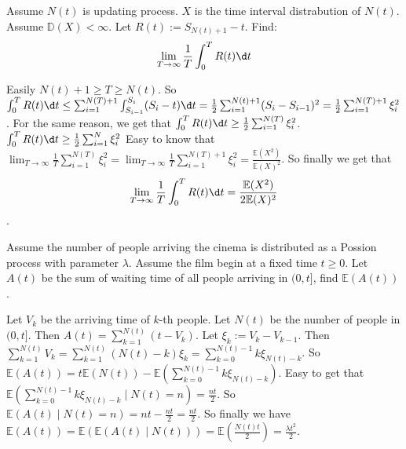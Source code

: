 \documentclass{ctexart}
\newif\ifpreface
\begin{document}
\large
\iffalse
\setlength{\baselineskip}{1.2em}
\ifpreface

\else
\maketitle
\fi
\fi
{}
\begin{problem}\label{pro:1}
  Assume \(N(t)\) is updating process. \(X\) is the time interval distrabution of \(N(t)\).
  Assume \(\mathbb{D}(X)<\infty\).
  Let \(R(t):=S_{N(t)+1}-t\). Find:
  \[
    \lim_{T \to \infty} \frac{1}{T}\int_{0}^{T}R(t) \d t
  \]
\end{problem}
\begin{solution}
  Easily \(N(t)+1 \geq T \geq N(t)\).
  So \(\int_{0}^{T}R(t) \d t \leq \sum_{i=1}^{N(T)+1} \int_{S_{i-1}}^{S_i}(S_i-t) \d t=\frac{1}{2}\sum_{i=1}^{N(t)+1} (S_i-S_{i-1})^2=\frac{1}{2} \sum_{i=1}^{N(T)+1} \xi_i^2\).
  For the same reason, we get that \(\int_{0}^{T}R(t) \d t \geq \frac{1}{2} \sum_{i=1}^{N(T)} \xi_i^2\).
  \(\int_{0}^T R(t)\d t \geq \frac{1}{2}\sum_{i=1}^{N} \xi_i^2\)
  Easy to know that \(\lim_{T \to \infty} \frac{1}{T} \sum_{i=1}^{N(T)} \xi_i^2=\lim_{T \to \infty} \frac{1}{T} \sum_{i=1}^{N(T)+1} \xi_i^2=\frac{\mathbb{E}(X^2)}{\mathbb{E}(X)^2}\).
  So finally we get that
  \[
    \lim_{T \to \infty} \frac{1}{T}\int_{0}^{T}R(t) \d t=\frac{\mathbb{E}(X^2)}{2\mathbb{E}(X)^2}
  \]
  .
\end{solution}
\begin{problem}\label{pro:2}
  Assume the number of people arriving the cinema is distributed as a Possion process with parameter \(\lambda\).
  Assume the film begin at a fixed time \(t \geq 0\).
  Let \(A(t)\) be the sum of waiting time of all people arriving in \((0,t]\), find \(\mathbb{E}(A(t))\).
\end{problem}
\begin{solution}
  Let \(V_k\) be the arriving time of \(k\)-th people. Let \(N(t)\) be the number of people in \((0,t]\).
  Then \(A(t)=\sum_{k=1}^{N(t)} (t-V_k)\). Let \(\xi_k:=V_k-V_{k-1}\).
  Then \(\sum_{k=1}^{N(t)} V_k=\sum_{k=1}^{N(t)} (N(t)-k)\xi_k=\sum_{k=0}^{N(t)-1} k \xi_{N(t)-k}\).
  So \(\mathbb{E}(A(t))=t \mathbb{E}(N(t))-\mathbb{E}(\sum_{k=0}^{N(t)-1} k\xi_{N(t)-k})\).
  Easy to get that \(\mathbb{E}(\sum_{k=0}^{N(t)-1} k\xi_{N(t)-k} \mid N(t)=n)=\frac{nt}{2}\).
  So \(\mathbb{E}(A(t) \mid N(t)=n)=nt-\frac{nt}{2}=\frac{nt}{2}\).
  So finally we have \(\mathbb{E}(A(t))=\mathbb{E}(\mathbb{E}(A(t) \mid N(t)))=\mathbb{E}(\frac{N(t)t}{2})=\frac{\lambda t^2}{2}\).
\end{solution}
\end{document}
